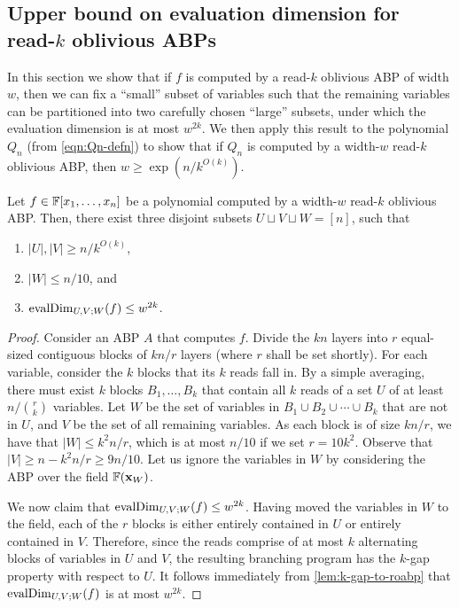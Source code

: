 \documentclass[11pt]{article}
\begin{document}
\subsection{Upper bound on evaluation dimension for read-$k$ oblivious ABPs}

In this section we show that if $f$ is computed by a read-$k$ oblivious ABP of width $w$, then we can fix a ``small'' subset of variables such that the remaining variables can be partitioned into
two carefully chosen ``large'' subsets, under which the evaluation dimension is at most $w^{2k}$. We then apply this result to the polynomial $Q_n$ (from \eqref{eqn:Qn-defn}) to show that if $Q_n$ is computed by a width-$w$ read-$k$ oblivious ABP, then $w \ge \exp(n/k^{O(k)})$. 

\begin{theorem}
\label{thm:read-k-eval-dim}
Let $f \in \F[x_1, \ldots, x_n]$ be a polynomial computed by a width-$w$ read-$k$ oblivious ABP. Then, there exist three disjoint subsets $U \sqcup V \sqcup W = [n]$, such that 
\begin{enumerate}
\item $|U|, |V| \ge n/k^{O(k)}$,
\item $|W| \le n/10$, and
\item $\operatorname{evalDim}_{U,V;W}(f) \le w^{2k}$.
\end{enumerate}
\end{theorem}

\begin{proof}
Consider an ABP $A$ that computes $f$.
Divide the $kn$ layers into $r$ equal-sized contiguous blocks of $kn/r$ layers (where $r$ shall be set shortly).
For each variable, consider the $k$ blocks that its $k$ reads fall in.
By a simple averaging, there must exist $k$ blocks $B_1,\ldots, B_k$ that contain all $k$ reads of a set $U$ of at least $n / \binom{r}{k}$ variables.
Let $W$ be the set of variables in $B_1 \cup B_2 \cup \cdots \cup B_k$ that are not in $U$, and $V$ be the set of all remaining variables.
As each block is of size $kn/r$, we have that $|W| \le k^2n/r$, which is at most $n/10$ if we set $r=10k^2$.  
Observe that $|V| \ge n - k^2n/r \ge 9n/10$.
Let us ignore the variables in $W$ by considering the ABP over the field $\F(\vecx_W)$.

We now claim that $\operatorname{evalDim}_{U,V;W}(f) \leq w^{2k}$. 
Having moved the variables in $W$ to the field, each of the $r$ blocks is either entirely contained in $U$ or entirely contained in $V$.
Therefore, since the reads comprise of at most $k$ alternating blocks of variables in $U$ and $V$, the resulting branching program has the $k$-gap property with respect to $U$. It follows immediately from \autoref{lem:k-gap-to-roabp} that $\operatorname{evalDim}_{U,V;W}(f)$ is at most $w^{2k}$. 
\end{proof}
\end{document}
